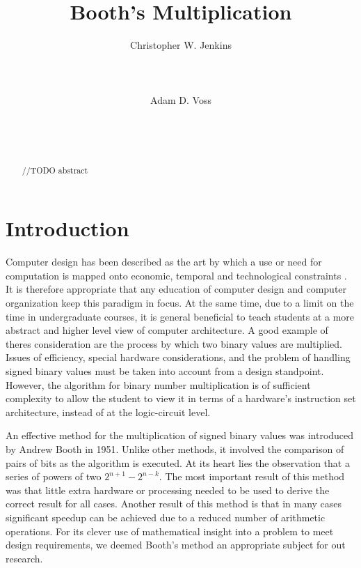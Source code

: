 \documentclass{acm_proc_article-sp}
\begin{document}
\title{Booth's Multiplication}

\author{
    \alignauthor
    Christopher W.
Jenkins\\
       \\
       \\
       \\
    \alignauthor
    Adam D.
Voss\\
       \\
       \\
       \\
}

\maketitle

\begin{abstract}
//TODO abstract
\end{abstract}

\section{Introduction}
Computer design has been described as the art by which a use or need for computation is mapped onto economic, temporal and technological constraints \cite{ibm370}.
It is therefore appropriate that any education of computer design and computer organization keep this paradigm in focus.
At the same time, due to a limit on the time in undergraduate courses, it is general beneficial to teach students at a more abstract and higher level view of computer architecture.
A good example of theres consideration are the process by which two binary values are multiplied.
Issues of efficiency, special hardware considerations, and the problem of handling signed binary values must be taken into account from a design standpoint.
However, the algorithm for binary number multiplication is of sufficient complexity to allow the student to view it in terms of a hardware's instruction set architecture, instead of at the logic-circuit level.

An effective method for the multiplication of signed binary values was introduced by Andrew Booth in 1951.
Unlike other methods, it involved the comparison of pairs of bits as the algorithm is executed.
At its heart lies the observation that a series of powers of two $2^{n+1} - 2^{n-k}$.
The most important result of this method was that little extra hardware or processing needed to be used to derive the correct result for all cases\cite{needsCitation}.
Another result of this method is that in many cases significant speedup can be achieved due to a reduced number of arithmetic operations.
For its clever use of mathematical insight into a problem to meet design requirements, we deemed Booth's method an appropriate subject for out research\cite{booth}.
\end{document}
